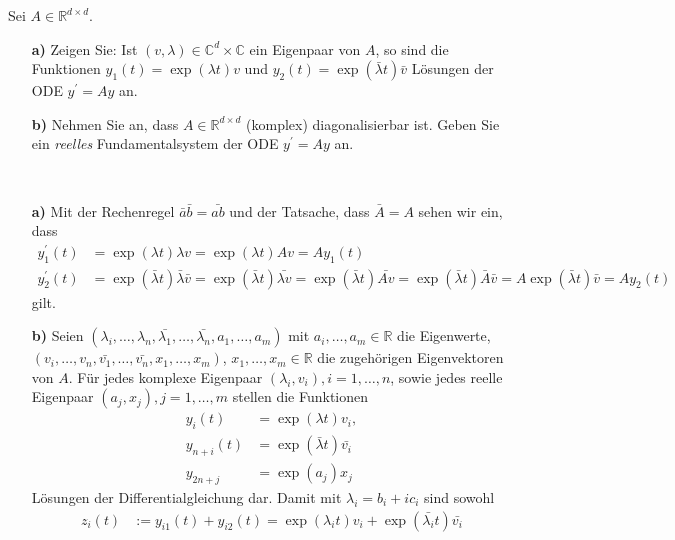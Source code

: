 \begin{exercise}
Sei $A \in \mathbb{R}^{d\times d}$.
\begin{itemize}
  \item [\textbf{a)}]Zeigen Sie: Ist $(v,\lambda) \in \mathbb{C}^d
  \times \mathbb{C}$ ein Eigenpaar von $A$, so sind die Funktionen
  $y_1(t) = \exp(\lambda t)v$ und $y_2(t) = \exp(\bar{\lambda}t)\bar{v}$
  Lösungen der ODE $y^{\prime} = Ay$ an.
  \item [\textbf{b)}] Nehmen Sie an, dass $A \in \mathbb{R}^
  {d \times d}$ (komplex) diagonalisierbar ist. Geben Sie ein
  \textit{reelles} Fundamentalsystem der ODE $y^{\prime} = Ay$ an.
\end{itemize}
\end{exercise}
\begin{solution}
\leavevmode \\
\begin{itemize}
  \item [\textbf{a)}]
  Mit der Rechenregel $\bar{a}\bar{b} = \bar{ab}$ und der Tatsache, dass $\bar{A} = A$
  sehen wir ein, dass
  \begin{align*}
    y_1^{\prime}(t) &= \exp(\lambda t)\lambda v = \exp(\lambda t)A v = Ay_1(t) \\
    y_2^{\prime}(t) &= \exp(\bar{\lambda}t)\bar{\lambda}\bar{v} = \exp(\bar{\lambda}t) \bar{\lambda v} =
    \exp(\bar{\lambda}t) \bar{Av} =  \exp(\bar{\lambda}t) \bar{A}\bar{v} = A\exp(\bar{\lambda}t)\bar{v} = Ay_2(t)
  \end{align*}
  gilt.
  \item [\textbf{b)}]
  Seien $(\lambda_i,\dots,\lambda_n,\bar{\lambda_1},\dots,\bar{\lambda_n},a_1,\dots,a_m)$
  mit $a_i,\dots,a_m \in \mathbb{R}$ die Eigenwerte, \\
  $(v_i,\dots,v_n,\bar{v_1},\dots,\bar{v_n},x_1,\dots,x_m)$, $x_1,\dots,x_m \in \mathbb{R}$
  die zugehörigen Eigenvektoren von $A$.
  Für jedes komplexe Eigenpaar $(\lambda_i, v_i), i = 1,\dots,n$, sowie jedes
  reelle Eigenpaar $(a_j,x_j), j = 1,\dots,m$ stellen die Funktionen
  \begin{align*}
    y_{i}(t) &= \exp(\lambda t)v_i, \\
    y_{n + i}(t) &= \exp(\bar{\lambda} t)\bar{v_i} \\
    y_{2n + j} &= \exp(a_j)x_j
  \end{align*}
  Lösungen der Differentialgleichung dar. Damit mit $\lambda_i = b_i + ic_i$ sind sowohl
  \begin{align*}
    z_i(t) &:= y_{i1}(t) + y_{i2}(t) = \exp(\lambda_i t)v_i + \exp(\bar{\lambda_i} t)\bar{v_i}

\end{align*}
\end{itemize}
\end{solution}
